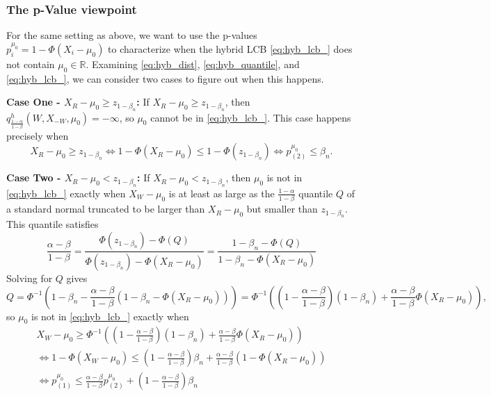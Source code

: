 \documentclass{article}
\newcommand{\R}{\mathbb{R}}
\begin{document}
\begin{appendix}
\subsubsection{The p-Value viewpoint} 

For the same setting as above, we want to use the  p-values $p^{\mu_0}_i = 1 - \Phi(X_i - \mu_0)$ to characterize when the hybrid LCB \eqref{eq:hyb_lcb_} does not contain $\mu_0 \in \R$. Examining \eqref{eq:hyb_dist}, \eqref{eq:hyb_quantile}, and \eqref{eq:hyb_lcb_}, we can consider two cases to figure out when this happens. \newline 

\noindent \textbf{Case One - $X_R - \mu_0 \geq z_{1 - \beta_n}$:} If $X_R - \mu_0 \geq z_{1 - \beta_n}$, then $q^h_{\frac{1-\alpha}{1-\beta}}(W, X_{-W}, \mu_0) = -\infty$, so $\mu_0$ cannot be in \eqref{eq:hyb_lcb_}. This case happens precisely when 
\begin{equation*}
    X_R-\mu_0 \geq z_{1 - \beta_n} \iff 1 - \Phi(X_R - \mu_0) \leq 1 - \Phi(z_{1- \beta_n}) \iff p^{\mu_0}_{(2)} \leq \beta_n.
\end{equation*}

\noindent \textbf{Case Two - $X_R - \mu_0 < z_{1 - \beta_n}$:} If $X_R - \mu_0 < z_{1 - \beta_n}$, then $\mu_0$ is not in \eqref{eq:hyb_lcb_} exactly when $X_W - \mu_0$ is at least as large as the $\frac{1-\alpha}{1-\beta}$ quantile $Q$ of a standard normal truncated to be larger than $X_{R} - \mu_0$ but smaller than $z_{1- \beta_n}$. This quantile satisfies 
\begin{equation*}
    \frac{\alpha - \beta}{1- \beta} = \frac{\Phi(z_{1 - \beta_n})  - \Phi(Q) }{\Phi(z_{1-\beta_n})  - \Phi(X_R - \mu_0) } = \frac{1 - \beta_n  - \Phi(Q) }{1 - \beta_n - \Phi(X_R - \mu_0) } 
\end{equation*}
Solving for $Q$ gives 
\begin{equation*}
    Q = \Phi^{-1} \left(1 - \beta_n - \frac{\alpha - \beta}{1 - \beta}\left(1 - \beta_n - \Phi(X_{R} - \mu_0) \right) \right) = \Phi^{-1} \left( \left(1 - \frac{\alpha - \beta}{1 - \beta}\right) (1 - \beta_n) + \frac{\alpha-\beta}{1-\beta}\Phi(X_{R} - \mu_0) \right),
\end{equation*}
so $\mu_0$ is not in \eqref{eq:hyb_lcb_} exactly when
\begin{align*}
        X_{W} - \mu_0 \geq \Phi^{-1} \left( \left(1 - \frac{\alpha - \beta}{1 - \beta}\right) (1- \beta_n) + \frac{\alpha-\beta}{1-\beta}\Phi(X_{R} - \mu_0) \right) \\
        \iff 1 -\Phi(X_{W} - \mu_0) \leq \left(1 - \frac{\alpha - \beta}{1 - \beta}\right)\beta_n + \frac{\alpha-\beta}{1-\beta}(1-\Phi(X_{R} - \mu_0))  \\
        \iff p^{\mu_0}_{(1)} \leq \frac{\alpha-\beta}{1-\beta}p^{\mu_0}_{(2)}  + \left(1 - \frac{\alpha - \beta}{1 - \beta}\right)\beta_n \\
\end{align*}


\end{appendix}
\end{document}
